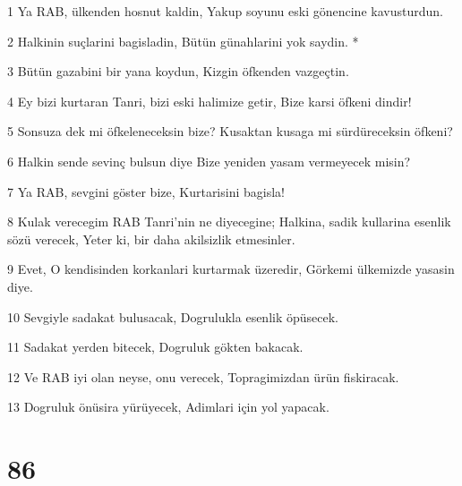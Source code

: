 \par 1 Ya RAB, ülkenden hosnut kaldin, Yakup soyunu eski gönencine kavusturdun.
\par 2 Halkinin suçlarini bagisladin, Bütün günahlarini yok saydin. *
\par 3 Bütün gazabini bir yana koydun, Kizgin öfkenden vazgeçtin.
\par 4 Ey bizi kurtaran Tanri, bizi eski halimize getir, Bize karsi öfkeni dindir!
\par 5 Sonsuza dek mi öfkeleneceksin bize? Kusaktan kusaga mi sürdüreceksin öfkeni?
\par 6 Halkin sende sevinç bulsun diye Bize yeniden yasam vermeyecek misin?
\par 7 Ya RAB, sevgini göster bize, Kurtarisini bagisla!
\par 8 Kulak verecegim RAB Tanri'nin ne diyecegine; Halkina, sadik kullarina esenlik sözü verecek, Yeter ki, bir daha akilsizlik etmesinler.
\par 9 Evet, O kendisinden korkanlari kurtarmak üzeredir, Görkemi ülkemizde yasasin diye.
\par 10 Sevgiyle sadakat bulusacak, Dogrulukla esenlik öpüsecek.
\par 11 Sadakat yerden bitecek, Dogruluk gökten bakacak.
\par 12 Ve RAB iyi olan neyse, onu verecek, Topragimizdan ürün fiskiracak.
\par 13 Dogruluk önüsira yürüyecek, Adimlari için yol yapacak.

\chapter{86}

